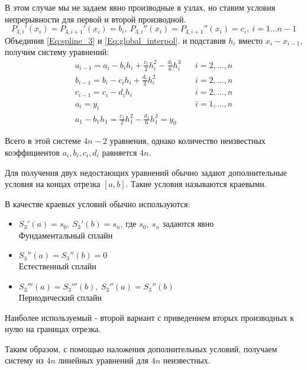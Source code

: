 
В этом случае мы не задаем явно производные в узлах, но ставим условия непрерывности для первой и второй производной.
\begin{equation}
    P_{3,i}' (x_i)=P_{3,i+1}' (x_i) = b_i,\  P_{3,i}'' (x_i )=P_{3,i+1}'' (x_i) = c_i, \ i=1\dots n-1
    \label{Eq:global_interpol}
\end{equation}
Объединив \eqref{Eq:spline_3} и \eqref{Eq:global_interpol}. и подставив $h_i$ вместо $x_i - x_{i-1}$, получим систему уравнений:
\begingroup
\Large
\begin{equation}
\begin{array}{lr}
     a_{i-1} = a_i - b_i h_i +\frac{c_i}{2}h_i^2 - \frac{d_i}{6}h_i^3\ \ \ \  & i = 2,\dots, n  \\
     b_{i-1} = b_i - c_i h_i +\frac{d_i}{2}h_i^2 & i = 2,\dots, n  \\
     c_{i-1} = c_i - d_i h_i & i = 2,\dots, n  \\
     a_i = y_i & i = 1,\dots, n \\
     a_1 - b_1 h_1 = \frac{c_1}{2} h_1^2 - \frac{d_1}{6} h_1^3 = y_0 &
\end{array}
\label{Sys:step0}
\end{equation}
\endgroup

Всего в этой системе $4n - 2$ уравнения, однако количество неизвестных коэффициентов $a_i,b_i,c_i,d_i$ равняется $4n$.

Для получения двух недостающих уравнений обычно задают дополнительные условия на концах отрезка $[a,b]$. Такие условия называются краевыми.

В качестве краевых условий обычно используются:
\begin{itemize}
    \item  $S_3'(a) = s_0,\  S_3'(b) = s_n$, где $s_0,\ s_n$ задаются явно \\
    Фундаментальный сплайн
    \item $S_3''(a) = S_3''(b) = 0$ \\
    Естественный сплайн
    \item $S_3'''(a) = S_3'''(b),\ S_3''(a) = S_3''(b)$ \\
    Периодический сплайн
\end{itemize}

Наиболее используемый - второй вариант с приведением вторых производных к нулю на границах отрезка.

Таким образом, с помощью наложения дополнительных условий, получаем систему из $4n$ линейных уравнений для $4n$ неизвестных.